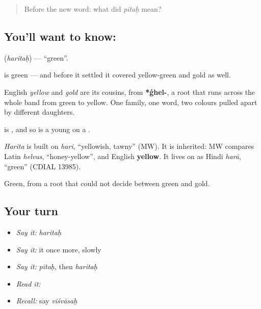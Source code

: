 \label{lesson:SA-C44-green}



\begin{quote}
Before the new word: what did \emph{pītaḥ} mean?
\end{quote}

\subsection*{You'll want to know: }
\textbf{} (\emph{haritaḥ}) — \textquotedblleft{}green\textquotedblright{}.

\textbf{} is green — and before it settled it covered yellow-green and gold as well.

English \emph{yellow} and \emph{gold} are its cousins, from \textbf{*ǵhel-}, a root that runs across the whole band from green to yellow. One family, one word, two colours pulled apart by different daughters.

 is \textbf{}, and so is a young  on a .

\begin{cousinweb}
\emph{Harita} is built on \emph{hari}, \textquotedblleft{}yellowish, tawny\textquotedblright{} (MW). It is inherited: MW compares Latin \emph{helvus}, \textquotedblleft{}honey-yellow\textquotedblright{}, and English \textbf{yellow}. It lives on as Hindi \emph{harā}, \textquotedblleft{}green\textquotedblright{} (CDIAL 13985).
\end{cousinweb}

\begin{grammarlens}[title={What you've built}]
Green, from a root that could not decide between green and gold.
\end{grammarlens}

\subsection*{Your turn}
\begin{itemize}
\raggedright
  \item \emph{Say it:} \emph{haritaḥ}
  \item \emph{Say it:} it once more, slowly
  \item \emph{Say it:} \emph{pītaḥ}, then \emph{haritaḥ}
  \item \emph{Read it:} \textbf{}
  \item \emph{Recall:} say \emph{viśvāsaḥ}
\end{itemize}

